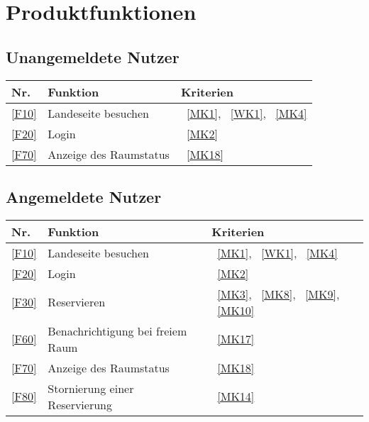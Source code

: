

\chapter{Produktfunktionen}
\label{chap:product_functions}

\section{Unangemeldete Nutzer}\label{sec:unangemeldete-benutzer-funktionen}
\begin{table}[htbp]
    \centering
    \begin{tabularx}{\textwidth}{ l|X|l }
        \textbf{Nr.} & \textbf{Funktion} & \textbf{Kriterien} \\ \hline\hline
        \ref{F10} & Landeseite besuchen &~\ref{MK1}, ~\ref{WK1}, ~\ref{MK4} \\
        \ref{F20} & Login &~\ref{MK2} \\
        \ref{F70} & Anzeige des Raumstatus &~\ref{MK18} \\
    \end{tabularx}
    \label{tab:non_loggedin_functions}
\end{table}

\section{Angemeldete Nutzer}\label{sec:angemeldete-benutzer-funktionen}
\begin{table}[htbp]
    \centering
    \begin{tabularx}{\textwidth}{ l|X|l }
        \textbf{Nr.} & \textbf{Funktion} & \textbf{Kriterien} \\ \hline\hline
        \ref{F10} & Landeseite besuchen &~\ref{MK1}, ~\ref{WK1}, ~\ref{MK4} \\
        \ref{F20} & Login &~\ref{MK2} \\
        \ref{F30} & Reservieren &~\ref{MK3}, ~\ref{MK8}, ~\ref{MK9}, ~\ref{MK10} \\
        \ref{F60} & Benachrichtigung bei freiem Raum &~\ref{MK17} \\
        \ref{F70} & Anzeige des Raumstatus &~\ref{MK18} \\
        \ref{F80} & Stornierung einer Reservierung &~\ref{MK14} \\
    \end{tabularx}
    \label{tab:loggedin_functions}
\end{table}

